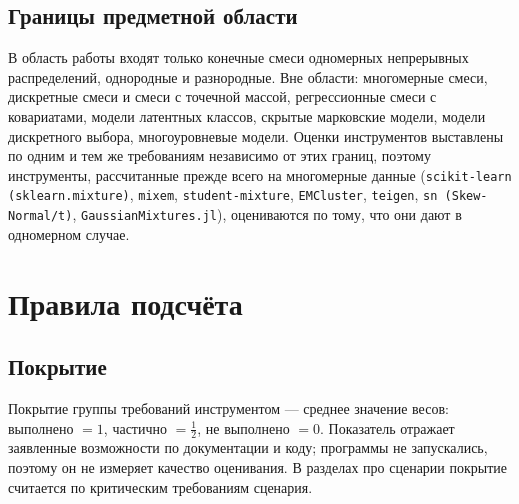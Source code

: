 \documentclass[10pt,a4paper]{article}
\begin{document}
\subsection{Границы предметной области}
В область работы входят только конечные смеси одномерных непрерывных распределений, однородные и разнородные. Вне области: многомерные смеси,
дискретные смеси и смеси с точечной массой, регрессионные смеси с ковариатами, модели латентных классов, скрытые марковские модели, модели дискретного выбора,
многоуровневые модели. Оценки инструментов выставлены по одним и тем же требованиям независимо от этих границ, поэтому инструменты, рассчитанные прежде всего
на многомерные данные (\texttt{scikit-learn (sklearn.mixture)}, \texttt{mixem}, \texttt{student-mixture}, \texttt{EMCluster}, \texttt{teigen}, \texttt{sn (Skew-Normal/t)}, \texttt{GaussianMixtures.jl}), оцениваются по тому, что они дают в одномерном случае.

\section{Правила подсчёта}
\subsection{Покрытие}
Покрытие группы требований инструментом --- среднее значение весов: выполнено $=1$, частично $=\tfrac12$, не выполнено $=0$. Показатель отражает заявленные возможности по
документации и коду; программы не запускались, поэтому он не измеряет качество оценивания. В разделах про сценарии покрытие считается по критическим требованиям сценария.
\end{document}
